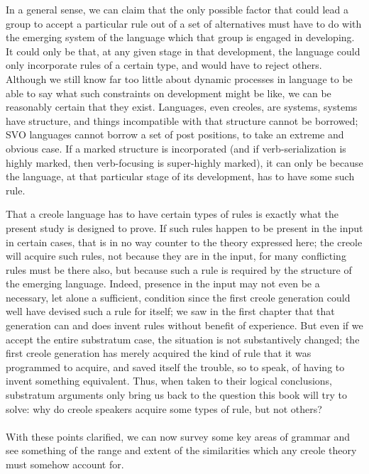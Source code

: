 In a general sense, we can claim that the only possible factor that could lead a group to accept a particular rule out of a set of alternatives must have to do with the emerging system of the language which that group is engaged in developing. It could only be that, at any given stage in that development, the language could only incorpor\-ate rules of a certain type, and would have to reject others. Although we still know far too little about dynamic processes in language to be able to say what such constraints on development might be like, we can be reasonably certain that they exist. Languages, even creoles, are systems, systems have structure, and things incompatible with that structure cannot be borrowed; SVO languages cannot borrow a set of post positions, to take an extreme and obvious case. If a marked struc\-ture is incorporated (and if verb-serialization is highly marked, then verb-focusing is super-highly marked), it can only be because the language, at that particular stage of its development, has to have some such rule.

That a creole language has to have certain types of rules is
exactly what the present study is designed to prove. If such rules happen to be present in the input in certain cases, that is in no way counter to the theory expressed here; the creole will acquire such rules, not because they are in the input, for many conflicting rules must be there also, but because such a rule is required by the struc\-ture of the emerging language. Indeed, presence in the input may not even be a necessary, let alone a sufficient, condition since the first creole generation could well have devised such a rule for itself; we saw in the first chapter that that generation can and does invent rules without benefit of experience. But even if we accept the entire sub\-stratum case, the situation is not substantively changed; the first creole generation has merely acquired the kind of rule that it was programmed to acquire, and saved itself the trouble, so to speak, of having to invent something equivalent. Thus, when taken to their logical conclusions, substratum arguments only bring us back to the question this book will try to solve: why do creole speakers acquire some types of rule, but not others?\\\\

With these points clarified, we can now survey some key areas of grammar and see something of the range and extent of the similarities which any creole theory must somehow account for.

